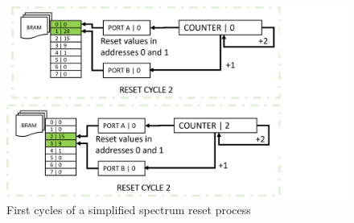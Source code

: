 \begin{figure}[H]
  \centering
  \includegraphics[width=\linewidth]{media/spectrum_reset_cycles.png}
  \caption{First cycles of a simplified spectrum reset process}
  \label{fig:spectrum_reset_cycles} 
\end{figure}
